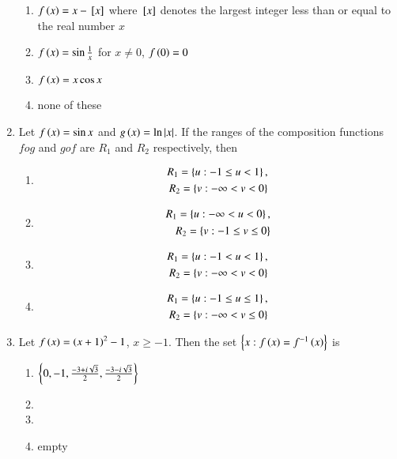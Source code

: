 \documentclass[journal,12pt,twocolumn]{IEEEtran}
\theoremstyle{remark}
\begin{document}
\begin{enumerate}
\hfill{}

\begin{enumerate}
\item $f\left(x\right)=x-{}\left[x\right]$ where ${}\left[x\right]$ denotes the largest integer less than or equal to the real number $x$
\item $f\left(x\right)=\sin{\frac{1}{x}}$ for $x\neq0$, $f\left(0\right)=0$
\item $f\left(x\right)=x\cos{x}$
\item none of these
\end{enumerate}

\item Let $f\left(x\right)=\sin{x}$ and $g\left(x\right)=\ln{|x|}$. If the ranges of the composition functions $fog$ and $gof$ are $R_1$ and $R_2$ respectively, then 

\hfill{}

\begin{enumerate}
\item
\begin{align*}
R_1=\left\{u:-1\le u<1\right\}, \\ R_2=\left\{v:-\infty<v<0\right\}
\end{align*}
\item
\begin{align*}
R_1=\left\{u:-\infty<u<0\right\}, \\ R_2=\left\{v:-1\le v\le0\right\}
\end{align*}
\item
\begin{align*}
R_1=\left\{u:-1<u<1\right\}, \\ R_2=\left\{v:-\infty<v<0\right\}
\end{align*}
\item
\begin{align*}
R_1=\left\{u:-1\le u\le1\right\}, \\ R_2=\left\{v:-\infty<v\le0\right\}
\end{align*}
\end{enumerate}

\item Let $f\left(x\right)=\left(x+1\right)^{2}-1$, $x\ge-1$. Then the set $\left\{x:f\left(x\right)=f^{-1}\left(x\right)\right\}$ is

\hfill{}

\begin{enumerate}
\item $\left\{0, -1, \frac{-3+i\sqrt{3}}{2}, \frac{-3-i\sqrt{3}}{2}\right\}$
\item {}
\item {}
\item empty
\end{enumerate}


\end{enumerate}
\end{document}
